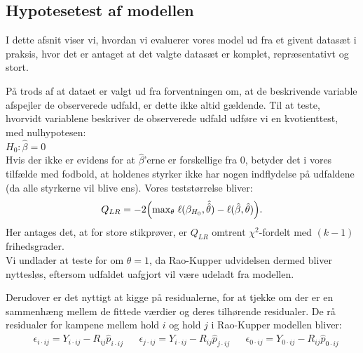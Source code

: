 \documentclass[11pt,a4paper]{article}
\begin{document}
\subsection{Hypotesetest af modellen}
I dette afsnit viser vi, hvordan vi evaluerer vores model ud fra et givent datasæt i praksis, hvor det er antaget at det valgte datasæt er komplet, repræsentativt og stort. \par
På trods af at dataet er valgt ud fra forventningen om, at de beskrivende variable afspejler de observerede udfald, er dette ikke altid gældende. Til at teste, hvorvidt variablene beskriver de observerede udfald udføre vi en kvotienttest, med nulhypotesen:\\
$H_0: \hat{\beta} = 0$\\
Hvis der ikke er evidens for at $\hat{\beta}$'erne er forskellige fra 0, betyder det i vores tilfælde med fodbold, at holdenes styrker ikke har nogen indflydelse på udfaldene (da alle styrkerne vil blive ens). Vores teststørrelse bliver:
\begin{align*}
Q_{LR} = -2\Big{(}\text{max}_\theta \;\ell (\beta_{H_0},\hat{\hat{\theta}})-\ell (\hat{\beta},\hat{\theta})\Big{)}.
\end{align*}
Her antages det, at for store stikprøver, er $Q_{LR}$ omtrent $\chi^2$-fordelt med $(k-1)$ frihedsgrader. \\
Vi undlader at teste for om $\theta=1$, da Rao-Kupper udvidelsen dermed bliver nyttesløs, eftersom udfaldet uafgjort vil være udeladt fra modellen. \par
Derudover er det nyttigt at kigge på residualerne, for at tjekke om der er en sammenhæng mellem de fittede værdier og deres tilhørende residualer. De rå residualer for kampene mellem hold $i$ og hold $j$ i Rao-Kupper modellen bliver:
\begin{align*}
&\epsilon_{i\cdot ij}=Y_{i\cdot ij}-R_{ij}\hat{p}_{i\cdot ij}
&&\epsilon_{j\cdot ij}=Y_{i\cdot ij}-R_{ij} \hat{p}_{j\cdot ij}
&&\epsilon_{0\cdot ij}=Y_{0\cdot ij}-R_{ij} \hat{p}_{0\cdot ij}
\end{align*}
\end{document}
